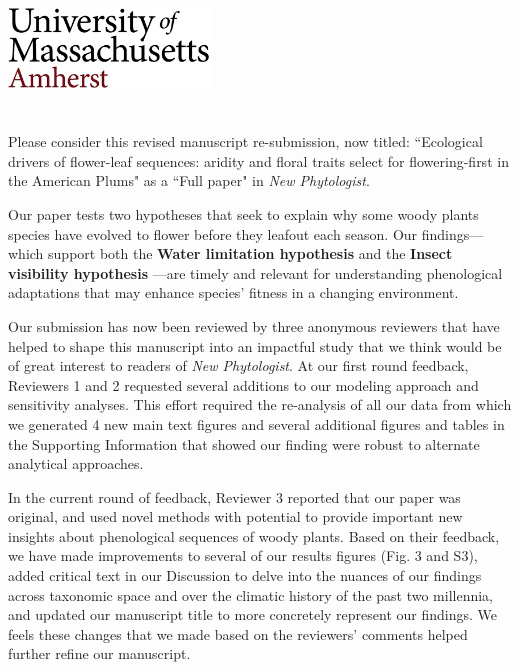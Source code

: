 \documentclass{article}[12pt]
\begin{document}

\noindent\includegraphics[width=0.4\textwidth]{umasslogo}\\\\

\\ %

\noindent Please consider this revised manuscript re-submission, now titled: ``Ecological drivers of flower-leaf sequences: aridity and floral traits select for flowering-first in the American Plums" as a ``Full paper" in \textit{New Phytologist}.

Our paper tests two hypotheses that seek to explain why some woody plants species have evolved to flower before they leafout each season. Our findings---which support both the \textbf{Water limitation hypothesis} \citep{Gougherty2018,Buonaiuto2020} and the \textbf{Insect visibility hypothesis} \citep{Janzen1967}---are timely and relevant for understanding phenological adaptations that may enhance species' fitness in a changing environment.

Our submission has now been reviewed by three anonymous reviewers that have helped to shape this manuscript into an impactful study that we think would be of great interest to readers of \emph{New Phytologist}. At our first round feedback, Reviewers 1 and 2 requested several additions to our modeling approach and sensitivity analyses. This effort required the re-analysis of all our data from which we generated 4 new main text figures and several additional figures and tables in the Supporting Information that showed our finding were robust to alternate analytical approaches.

In the current round of feedback, Reviewer 3 reported that our paper was original, and used novel methods with potential to provide important new insights about phenological sequences of woody plants. Based on their feedback, we have made improvements to several of our results figures (Fig. 3 and S3), added critical text in our Discussion to delve into the nuances of our findings across taxonomic space and over the climatic history of the past two millennia, and updated our manuscript title to more concretely represent our findings. We feels these changes that we made based on the reviewers' comments helped further refine our manuscript.
\end{document}
